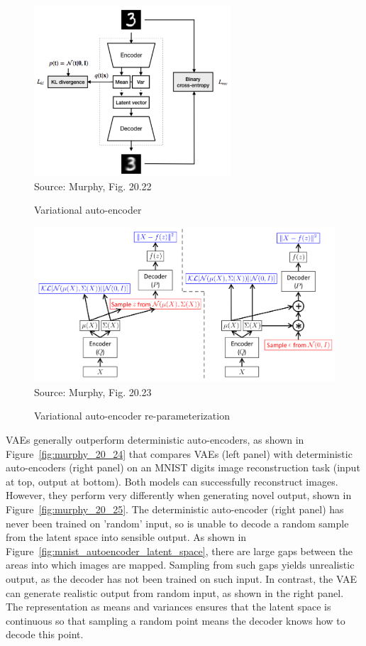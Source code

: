 \begin{figure}
\centering
\includegraphics[height=2.5in]{murphy_20_22.png}\\

\scriptsize Source: Murphy, Fig. 20.22 \normalsize
\caption{Variational auto-encoder}
\label{fig:murphy_20_22}
\end{figure}


\begin{figure}
\begin{center}
\includegraphics[width=\textwidth]{murphy_20_23.png}\\

\scriptsize Source: Murphy, Fig. 20.23 \normalsize
\end{center}
\caption{Variational auto-encoder re-parameterization}
\label{fig:murphy_20_23}
\end{figure}

VAEs generally outperform deterministic auto-encoders, as shown in Figure~\ref{fig:murphy_20_24} that compares VAEs (left panel) with deterministic auto-encoders (right panel) on an MNIST digits image reconstruction task (input at top, output at bottom). Both models can successfully reconstruct images. However, they perform very differently when generating novel output, shown in Figure~\ref{fig:murphy_20_25}. The deterministic auto-encoder (right panel) has never been trained on 'random' input, so is unable to decode a random sample from the latent space into sensible output. As shown in Figure~\ref{fig:mnist_autoencoder_latent_space}, there are large gaps between the areas into which images are mapped. Sampling from such gaps yields unrealistic output, as the decoder has not been trained on such input. In contrast, the VAE can generate realistic output from random input, as shown in the right panel. The representation as means and variances ensures that the latent space is continuous so that sampling a random point means the decoder knows how to decode this point. 

